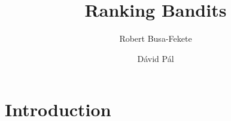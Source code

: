 \documentclass{article}
\begin{document}
\title{Ranking Bandits}
\author{Robert Busa-Fekete \and D\'avid P\'al}
\maketitle

\section{Introduction}
\end{document}
